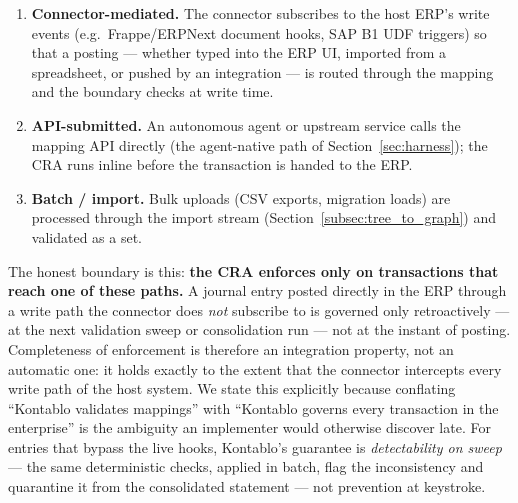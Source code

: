 \begin{enumerate}
    \item \textbf{Connector-mediated.} The connector subscribes to the host
    ERP's write events (e.g.\ Frappe/ERPNext document hooks, SAP B1 UDF
    triggers) so that a posting --- whether typed into the ERP UI, imported
    from a spreadsheet, or pushed by an integration --- is routed through the
    mapping and the boundary checks at write time.
    \item \textbf{API-submitted.} An autonomous agent or upstream service calls
    the mapping API directly (the agent-native path of
    Section~\ref{sec:harness}); the CRA runs inline before the transaction is
    handed to the ERP.
    \item \textbf{Batch / import.} Bulk uploads (CSV exports, migration loads)
    are processed through the import stream
    (Section~\ref{subsec:tree_to_graph}) and validated as a set.
\end{enumerate}

The honest boundary is this: \textbf{the CRA enforces only on transactions that
reach one of these paths.} A journal entry posted directly in the ERP through a
write path the connector does \emph{not} subscribe to is governed only
retroactively --- at the next validation sweep or consolidation run --- not at
the instant of posting. Completeness of enforcement is therefore an integration
property, not an automatic one: it holds exactly to the extent that the
connector intercepts every write path of the host system. We state this
explicitly because conflating ``Kontablo validates mappings'' with ``Kontablo
governs every transaction in the enterprise'' is the ambiguity an implementer
would otherwise discover late. For entries that bypass the live hooks,
Kontablo's guarantee is \emph{detectability on sweep} --- the same
deterministic checks, applied in batch, flag the inconsistency and quarantine
it from the consolidated statement --- not prevention at keystroke.

